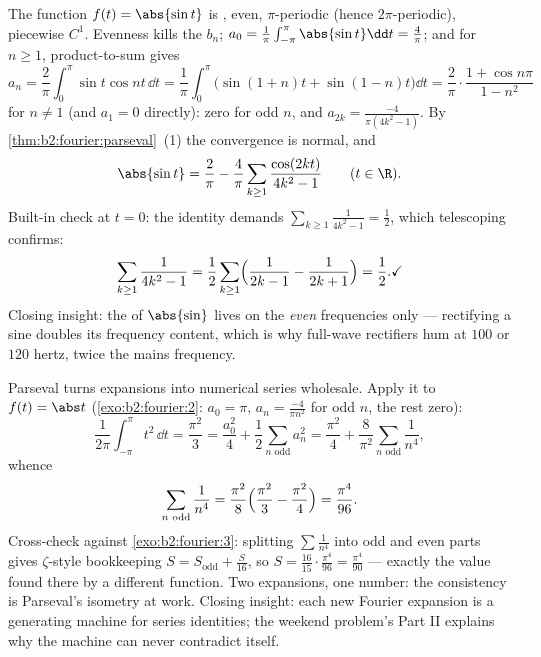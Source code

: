 \begin{example}\label{ex:b2:fourier:abssin}
The function $f(t) = \abs{\sin t}$ is , even,
$\pi$-periodic (hence $2\pi$-periodic), piecewise $C^1$.
Evenness kills the $b_n$; $a_0 = \frac1\pi\int_{-\pi}^{\pi}
\abs{\sin t}\dd t = \frac4\pi$; and for $n \geq 1$,
product-to-sum gives
\[
a_n = \frac2\pi\int_0^\pi \sin t\cos nt\,\dd t
= \frac{1}{\pi}\int_0^\pi\bigl(\sin(1+n)t +
\sin(1-n)t\bigr)\dd t
= \frac2\pi\cdot\frac{1 + \cos n\pi}{1 - n^2}
\]
for $n \neq 1$ (and $a_1 = 0$ directly): zero for odd $n$, and
$a_{2k} = \frac{-4}{\pi(4k^2-1)}$. By
\cref{thm:b2:fourier:parseval}~(1) the convergence is normal,
and
\[
\abs{\sin t} = \frac{2}{\pi} - \frac{4}{\pi}
\sum_{k\geq1}\frac{\cos(2kt)}{4k^2 - 1}
\qquad (t \in \R) .
\]
Built-in check at $t = 0$: the identity demands
$\sum_{k\geq1}\frac{1}{4k^2-1} = \frac12$, which telescoping
confirms:
\[
\sum_{k\geq1}\frac{1}{4k^2-1}
= \frac12\sum_{k\geq1}\Bigl(\frac{1}{2k-1} -
\frac{1}{2k+1}\Bigr) = \frac12 . \checkmark
\]
Closing insight: the  of $\abs{\sin}$ lives on the
\emph{even} frequencies only --- rectifying a sine doubles its
frequency content, which is why full-wave rectifiers hum at
$100$ or $120$ hertz, twice the mains frequency.
\end{example}

\begin{example}\label{ex:b2:fourier:zetafourodd}
Parseval turns expansions into numerical series wholesale.
Apply it to $f(t) = \abs t$ (\cref{exo:b2:fourier:2}: $a_0 =
\pi$, $a_n = \frac{-4}{\pi n^2}$ for odd $n$, the rest zero):
\[
\frac{1}{2\pi}\int_{-\pi}^{\pi}t^2\,\dd t = \frac{\pi^2}{3}
= \frac{a_0^2}{4} + \frac12\sum_{n \text{ odd}} a_n^2
= \frac{\pi^2}{4} +
\frac{8}{\pi^2}\sum_{n\text{ odd}}\frac{1}{n^4} ,
\]
whence
\[
\sum_{n\text{ odd}}\frac{1}{n^4}
= \frac{\pi^2}{8}\Bigl(\frac{\pi^2}{3} -
\frac{\pi^2}{4}\Bigr) = \frac{\pi^4}{96} .
\]
Cross-check against \cref{exo:b2:fourier:3}: splitting
$\sum\frac1{n^4}$ into odd and even parts gives $\zeta$-style
bookkeeping $S = S_{\mathrm{odd}} + \frac{S}{16}$, so $S =
\frac{16}{15}\cdot\frac{\pi^4}{96} = \frac{\pi^4}{90}$ ---
exactly the value found there by a different function. Two
expansions, one number: the consistency is Parseval's isometry
at work. Closing insight: each new Fourier expansion is a
generating machine for series identities; the weekend
problem's Part II explains why the machine can never
contradict itself.
\end{example}


